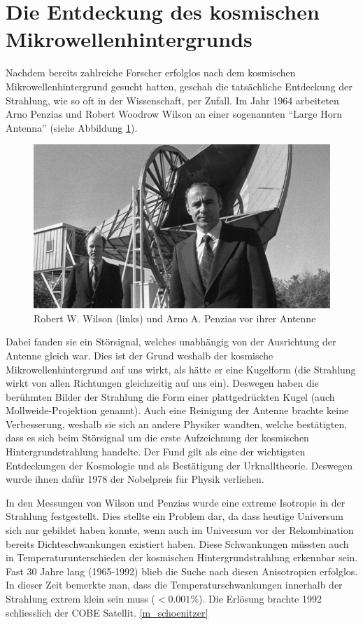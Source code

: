 \section{Die Entdeckung des kosmischen Mikrowellenhintergrunds}
Nachdem bereits zahlreiche Forscher erfolglos nach dem kosmischen 
Mikrowellenhintergrund gesucht hatten, geschah die tatsächliche Entdeckung der 
Strahlung, wie so oft in der Wissenschaft, per Zufall.
Im Jahr 1964 arbeiteten Arno Penzias und Robert Woodrow Wilson an einer 
sogenannten ``Large Horn Antenna'' (siehe Abbildung \ref{fig:wilson_penzias}).
\begin{figure}
	\includegraphics[width=\linewidth]{cmb/images/penzias-wilson-large-horn-antenna.jpg}
	\caption{Robert W. Wilson (links) und Arno A. Penzias vor ihrer Antenne}
	\label{fig:wilson_penzias}
\end{figure}
Dabei fanden sie ein Störsignal, welches unabhängig von der Ausrichtung der 
Antenne gleich war.
Dies ist der Grund weshalb der kosmische Mikrowellenhintergrund auf uns wirkt, als hätte er eine Kugelform
(die Strahlung wirkt von allen Richtungen gleichzeitig auf uns ein).
Deswegen haben die berühmten Bilder der Strahlung die Form einer plattgedrückten Kugel
(auch Mollweide-Projektion genannt).
Auch eine Reinigung der Antenne brachte keine Verbesserung, weshalb sie sich an 
andere Physiker wandten, welche bestätigten, dass es sich beim Störsignal um 
die erste Aufzeichnung der kosmischen Hintergrundstrahlung handelte.
Der Fund gilt als eine der wichtigsten Entdeckungen der Kosmologie und als 
Bestätigung der Urknalltheorie.
Deswegen wurde ihnen dafür 1978 der Nobelpreis für Physik verliehen.

In den Messungen von Wilson und Penzias wurde eine extreme Isotropie in der 
Strahlung festgestellt.
Dies stellte ein Problem dar, da dass heutige Universum sich nur gebildet haben 
konnte, wenn auch im Universum vor der Rekombination bereits Dichteschwankungen 
existiert haben.
Diese Schwankungen müssten auch in Temperaturunterschieden der kosmischen 
Hintergrundstrahlung erkennbar sein.
Fast 30 Jahre lang (1965-1992) blieb die Suche nach diesen Anisotropien 
erfolglos.
In dieser Zeit bemerkte man, dass die Temperaturschwankungen innerhalb der 
Strahlung extrem klein sein muss ($< 0.001\%$).
Die Erlösung brachte 1992 schliesslich der \ac{COBE} Satellit.
\ref{m_schoenitzer}